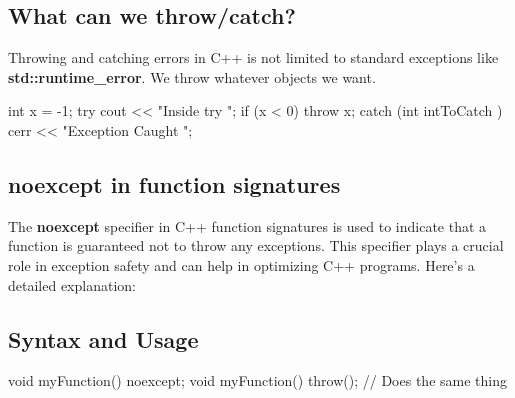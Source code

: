 \documentclass{report}
\begin{document}
\begin{concept}
    \bigbreak \noindent 
    \subsection{What can we throw/catch?}
    \bigbreak \noindent 
    Throwing and catching errors in C++ is not limited to standard exceptions like \textbf{std::runtime\_error}. We throw whatever objects we want.
    \bigbreak \noindent 
    \begin{cppcode}
        int x = -1;
        try {
            cout << "Inside try \n";
            if (x < 0) {
                throw x;
            }
        } catch (int intToCatch ) {
            cerr << "Exception Caught \n";
        }
    \end{cppcode}
    \bigbreak \noindent 

    \bigbreak \noindent 
    \subsection{noexcept in function signatures}
    \bigbreak \noindent 
    \begin{concept}
        The \textbf{noexcept} specifier in C++ function signatures is used to indicate that a function is guaranteed not to throw any exceptions. This specifier plays a crucial role in exception safety and can help in optimizing C++ programs. Here's a detailed explanation:
    \end{concept}

    \bigbreak \noindent 
    \subsection{Syntax and Usage}
    \bigbreak \noindent 
    \begin{cppcode}
        void myFunction() noexcept;
        void myFunction() throw(); // Does the same thing
    \end{cppcode}
    \bigbreak \noindent 

    \bigbreak \noindent 

\end{concept}
\end{document}
